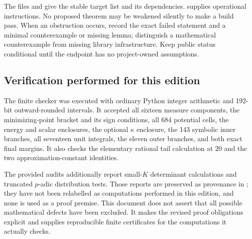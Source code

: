 The files  and
 give the stable target list and
its dependencies.  supplies operational instructions.
No proposed theorem may be weakened silently to make a build pass.
When an obstruction occurs, record the exact failed statement and a
minimal counterexample or missing lemma; distinguish a mathematical
counterexample from missing library infrastructure. Keep public status
conditional until the endpoint has no project-owned assumptions.

\subsection{Verification performed for this edition}
The finite checker was executed with ordinary Python integer arithmetic
and 192-bit outward-rounded intervals. It accepted all sixteen measure
components, the minimizing-point bracket and its sign conditions, all
684 potential cells, the energy and scalar enclosures, the optional
$\kappa$ enclosure, the 143 symbolic inner branches, all seventeen unit
integrals, the eleven outer branches, and both exact final margins.
It also checks the elementary rational tail calculation at $20$ and the
two approximation-constant identities.

The provided audits additionally report small-$K$ determinant
calculations and truncated $p$-adic distribution tests. Those reports
are preserved as provenance in ; they have not been
relabelled as computations performed in this edition, and none is used
as a proof premise. This document does not assert that all possible
mathematical defects have been excluded. It makes the revised proof
obligations explicit and supplies reproducible finite certificates for
the computations it actually checks.


